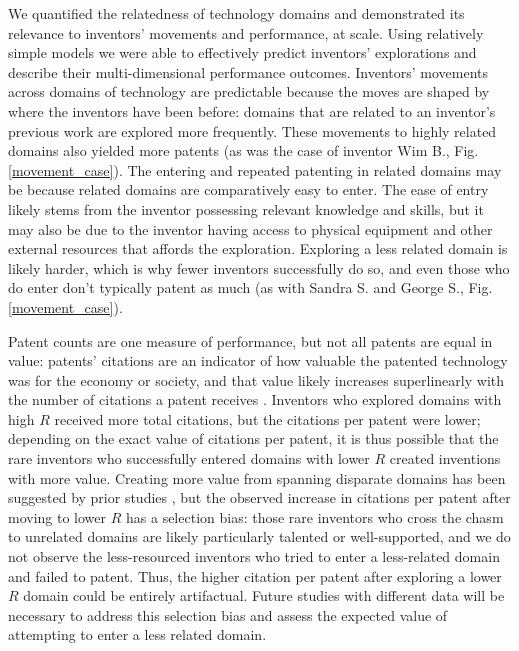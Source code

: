 \documentclass{dsj}
\begin{document}
We quantified the relatedness of technology domains and demonstrated its relevance to inventors' movements and performance, at scale. Using relatively simple models we were able to effectively predict inventors' explorations and describe their multi-dimensional performance outcomes. 
Inventors' movements across domains of technology are predictable because the moves are shaped by where the inventors have been before: domains that are related to an inventor's previous work are explored more frequently. These movements to highly related domains also yielded more patents (as was the case of inventor Wim B., Fig. \ref{movement_case}). The entering and repeated patenting in related domains may be because related domains are comparatively easy to enter. The ease of entry likely stems from the inventor possessing relevant knowledge and skills, but it may also be due to the inventor having access to physical equipment and other external resources that affords the exploration. 
Exploring a less related domain is likely harder, which is why fewer inventors successfully do so, and even those who do enter don't typically patent as much (as with Sandra S. and George S., Fig. \ref{movement_case}). 



Patent counts are one measure of performance, but not all patents are equal in value: patents' citations are an indicator of how valuable the patented technology was for the economy or society, and that value likely increases superlinearly with the number of citations a patent receives \cite{Trajtenberg1990,Albert1991,Harhoff1999,Hall2000,Gambardella2008}. Inventors who explored domains with high $R$ received more total citations, but the citations per patent were lower; depending on the exact value of citations per patent, it is thus possible that the rare inventors who successfully entered domains with lower $R$ created inventions with more value. Creating more value from spanning disparate domains has been suggested by prior studies \cite{Nooteboom2007,Nooteboom2000}, but the observed increase in citations per patent after moving to lower $R$ has a selection bias: those rare inventors who cross the chasm to unrelated domains are likely particularly talented or well-supported, and we do not observe the less-resourced inventors who tried to enter a less-related domain and failed to patent. Thus, the higher citation per patent after exploring a lower $R$ domain could be entirely artifactual. Future studies with different data will be necessary to address this selection bias and assess the expected value of attempting to enter a less related domain.
\end{document}
